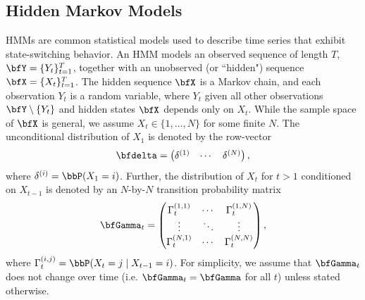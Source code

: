 \subsection{Hidden Markov Models}

HMMs are common statistical models used to describe time series that exhibit state-switching behavior. An HMM models an observed sequence of length $T$, $\bfY = \{Y_t\}_{t=1}^T$, together with an unobserved (or  ``hidden") sequence $\bfX = \{X_t\}_{t=1}^T$. The hidden sequence $\bfX$ is a Markov chain, and each observation $Y_t$ is a random variable, where $Y_t$ given all other observations $\bfY \setminus \{Y_t\}$ and hidden states $\bfX$ depends only on $X_t$. While the sample space of $\bfX$ is general, we assume $X_t \in \{1,\ldots,N\}$ for some finite $N$. The unconditional distribution of $X_1$ is denoted by the row-vector
%
\begin{equation}
    \bfdelta = \begin{pmatrix} \delta^{(1)} & \cdots & \delta^{(N)} \end{pmatrix},
\end{equation}
%
where $\delta^{(i)} = \bbP(X_1 = i)$. Further, the distribution of $X_t$ for $t > 1$ conditioned on $X_{t-1}$ is denoted by an $N$-by-$N$ transition probability matrix 
%
\begin{equation}
    \bfGamma_t = \begin{pmatrix} 
    \Gamma_t^{(1,1)} & \cdots & \Gamma_t^{(1,N)} \\
    \vdots & \ddots & \vdots \\
    \Gamma_t^{(N,1)} & \cdots & \Gamma_t^{(N,N)} \\
    \end{pmatrix},
\end{equation}
%
where $\Gamma_t^{(i,j)} = \bbP(X_t = j \mid X_{t-1} = i)$. %
For simplicity, we assume that $\bfGamma_t$ does not change over time (i.e. $\bfGamma_t = \bfGamma$ for all $t$) unless stated otherwise. 


